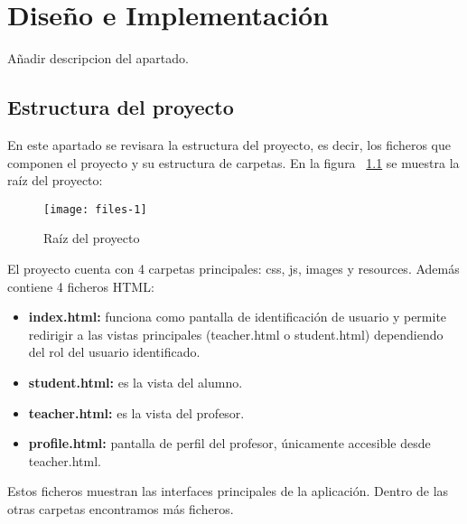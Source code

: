 
\chapter{Diseño e Implementación}
\label{diseno-e-implementacion}

Añadir descripcion del apartado.\\

\section{Estructura del proyecto}
\label{diseno-e-implementacion:estructura}

En este apartado se revisara la estructura del proyecto, es decir, los ficheros que componen el proyecto y su estructura de carpetas. En la figura ~\ref{fig:files-1} se muestra la raíz del proyecto:\\

\begin{figure}[h]
	\texttt{[image: files-1]}
	\caption{Raíz del proyecto}
	\label{fig:files-1}
\end{figure}

El proyecto cuenta con 4 carpetas principales: css, js, images y resources. Además contiene 4 ficheros HTML:

\begin{itemize}
\item \textbf{index.html:} funciona como pantalla de identificación de usuario y permite redirigir a las vistas principales (teacher.html o student.html) dependiendo del rol del usuario identificado.
\item \textbf{student.html:} es la vista del alumno.
\item \textbf{teacher.html:} es la vista del profesor.
\item \textbf{profile.html:} pantalla de perfil del profesor, únicamente accesible desde teacher.html.
\end{itemize}

Estos ficheros muestran las interfaces principales de la aplicación. Dentro de las otras carpetas encontramos más ficheros.

